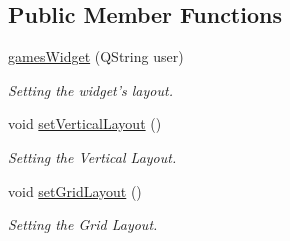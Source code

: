 \subsection*{Public Member Functions}
\begin{DoxyCompactItemize}
\item 
\hypertarget{classgamesWidget_ac1a043599182281e3acd0f0d85a87139}{\hyperlink{classgamesWidget_ac1a043599182281e3acd0f0d85a87139}{games\-Widget} (Q\-String user)}\label{classgamesWidget_ac1a043599182281e3acd0f0d85a87139}

\begin{DoxyCompactList}\small\item\em Setting the widget's layout. \end{DoxyCompactList}\item 
\hypertarget{classgamesWidget_ae7a5777c497a04b964bd3d1acd0fa5b5}{void \hyperlink{classgamesWidget_ae7a5777c497a04b964bd3d1acd0fa5b5}{set\-Vertical\-Layout} ()}\label{classgamesWidget_ae7a5777c497a04b964bd3d1acd0fa5b5}

\begin{DoxyCompactList}\small\item\em Setting the Vertical Layout. \end{DoxyCompactList}\item 
\hypertarget{classgamesWidget_a1641bda0950365a1f6707fe56d08e004}{void \hyperlink{classgamesWidget_a1641bda0950365a1f6707fe56d08e004}{set\-Grid\-Layout} ()}\label{classgamesWidget_a1641bda0950365a1f6707fe56d08e004}

\begin{DoxyCompactList}\small\item\em Setting the Grid Layout. \end{DoxyCompactList}\end{DoxyCompactItemize}
